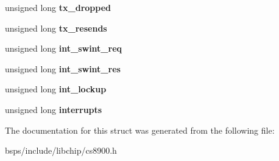 \begin{DoxyCompactItemize}
unsigned long {\bfseries tx\+\_\+dropped}
\item 
\mbox{\label{structeth__statistics_a86f73448d80134a5c6c01f4dc50fb232}} 
unsigned long {\bfseries tx\+\_\+resends}
\item 
\mbox{\label{structeth__statistics_a1a0bef2edf37bb7a3bbc16622a5743ab}} 
unsigned long {\bfseries int\+\_\+swint\+\_\+req}
\item 
\mbox{\label{structeth__statistics_ae15933d9911b83e10d8355a1feeb779f}} 
unsigned long {\bfseries int\+\_\+swint\+\_\+res}
\item 
\mbox{\label{structeth__statistics_a8efa1bcdcdc2af0912283c0aeb17fd07}} 
unsigned long {\bfseries int\+\_\+lockup}
\item 
\mbox{\label{structeth__statistics_ae2c126def95d815541ff9af1cbeb1fd2}} 
unsigned long {\bfseries interrupts}
\end{DoxyCompactItemize}


The documentation for this struct was generated from the following file\+:\begin{DoxyCompactItemize}
\item 
bsps/include/libchip/cs8900.\+h\end{DoxyCompactItemize}

